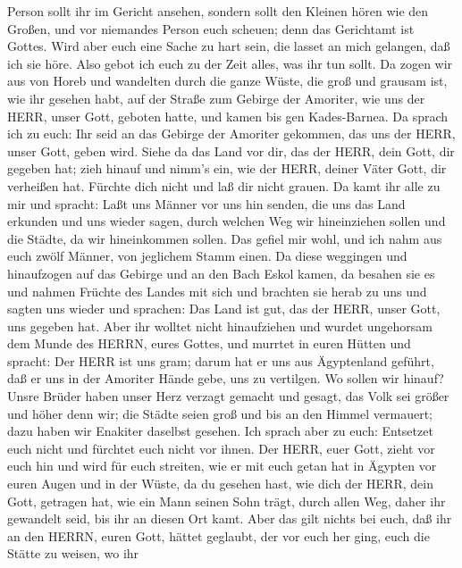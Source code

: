Person sollt ihr im Gericht ansehen, sondern sollt den Kleinen hören wie
den Großen, und vor niemandes Person euch scheuen; denn das Gerichtamt
ist Gottes. Wird aber euch eine Sache zu hart sein, die lasset an mich
gelangen, daß ich sie höre.  Also gebot ich euch zu der
Zeit alles, was ihr tun sollt.  Da zogen wir aus von Horeb
und wandelten durch die ganze Wüste, die groß und grausam ist, wie ihr
gesehen habt, auf der Straße zum Gebirge der Amoriter, wie uns der HERR,
unser Gott, geboten hatte, und kamen bis gen Kades-Barnea. 
Da sprach ich zu euch: Ihr seid an das Gebirge der Amoriter gekommen,
das uns der HERR, unser Gott, geben wird.  Siehe da das
Land vor dir, das der HERR, dein Gott, dir gegeben hat; zieh hinauf und
nimm's ein, wie der HERR, deiner Väter Gott, dir verheißen hat. Fürchte
dich nicht und laß dir nicht grauen.  Da kamt ihr alle zu
mir und spracht: Laßt uns Männer vor uns hin senden, die uns das Land
erkunden und uns wieder sagen, durch welchen Weg wir hineinziehen sollen
und die Städte, da wir hineinkommen sollen.  Das gefiel mir
wohl, und ich nahm aus euch zwölf Männer, von jeglichem Stamm einen.
 Da diese weggingen und hinaufzogen auf das Gebirge und an
den Bach Eskol kamen, da besahen sie es  und nahmen Früchte
des Landes mit sich und brachten sie herab zu uns und sagten uns wieder
und sprachen: Das Land ist gut, das der HERR, unser Gott, uns gegeben
hat.  Aber ihr wolltet nicht hinaufziehen und wurdet
ungehorsam dem Munde des HERRN, eures Gottes,  und murrtet
in euren Hütten und spracht: Der HERR ist uns gram; darum hat er uns aus
Ägyptenland geführt, daß er uns in der Amoriter Hände gebe, uns zu
vertilgen.  Wo sollen wir hinauf? Unsre Brüder haben unser
Herz verzagt gemacht und gesagt, das Volk sei größer und höher denn wir;
die Städte seien groß und bis an den Himmel vermauert; dazu haben wir
Enakiter daselbst gesehen.  Ich sprach aber zu euch:
Entsetzet euch nicht und fürchtet euch nicht vor ihnen. 
Der HERR, euer Gott, zieht vor euch hin und wird für euch streiten, wie
er mit euch getan hat in Ägypten vor euren Augen  und in
der Wüste, da du gesehen hast, wie dich der HERR, dein Gott, getragen
hat, wie ein Mann seinen Sohn trägt, durch allen Weg, daher ihr
gewandelt seid, bis ihr an diesen Ort kamt.  Aber das gilt
nichts bei euch, daß ihr an den HERRN, euren Gott, hättet geglaubt,
 der vor euch her ging, euch die Stätte zu weisen, wo ihr

